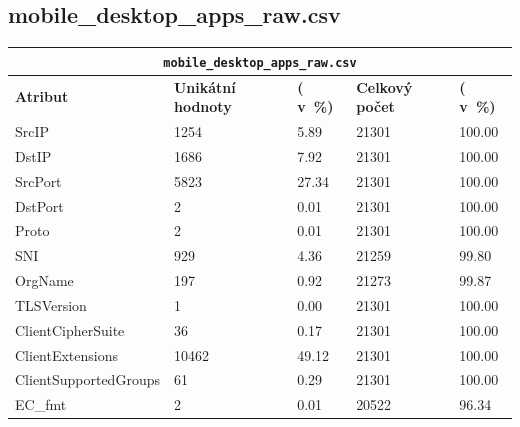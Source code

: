 \subsection{mobile\_desktop\_apps\_raw.csv}
\begin{table}[h!]
	\centering
	\begin{tabular}{lllll}
		\toprule
		\multicolumn{5}{c}{\texttt{mobile\_desktop\_apps\_raw.csv}} \\
		\midrule
		\textbf{Atribut}        & \textbf{Unikátní hodnoty} & \textbf{( v~\%)} & \textbf{Celkový počet} & \textbf{( v~\%)} \\
		\midrule
		SrcIP                   & 1254                                & 5.89             & 21301                    & 100.00           \\
		DstIP                   & 1686                                & 7.92             & 21301                    & 100.00           \\
		SrcPort                 & 5823                                & 27.34            & 21301                    & 100.00           \\
		DstPort                 & 2                                   & 0.01             & 21301                    & 100.00           \\
		Proto                   & 2                                   & 0.01             & 21301                    & 100.00           \\
		SNI                     & 929                                 & 4.36             & 21259                    & 99.80            \\
		OrgName                 & 197                                 & 0.92             & 21273                    & 99.87            \\
		TLSVersion              & 1                                   & 0.00             & 21301                    & 100.00           \\
		ClientCipherSuite       & 36                                  & 0.17             & 21301                    & 100.00           \\
		ClientExtensions        & 10462                               & 49.12            & 21301                    & 100.00           \\
		ClientSupportedGroups   & 61                                  & 0.29             & 21301                    & 100.00           \\
		EC\_fmt                 & 2                                   & 0.01             & 20522                    & 96.34            \\

\end{tabular}
\end{table}
